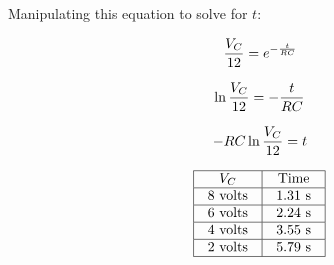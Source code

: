 Manipulating this equation to solve for $t$:

$${V_C \over 12} = e^{-{t \over RC}}$$

$$\ln {V_C \over 12} = -{t \over RC}$$

$$-RC \ln {V_C \over 12} = t$$




$$\vbox{\offinterlineskip
\halign{\strut
\vrule \quad\hfil # \ \hfil & 
\vrule \quad\hfil # \ \hfil \vrule \cr
\noalign{\hrule}
%
$V_C$ & Time  \cr
%
\noalign{\hrule}
%
8 volts & 1.31 s \cr
%
\noalign{\hrule}
%
6 volts & 2.24 s \cr
%
\noalign{\hrule}
%
4 volts & 3.55 s \cr
%
\noalign{\hrule}
%
2 volts & 5.79 s \cr
%
\noalign{\hrule}
} %
}$$ %




